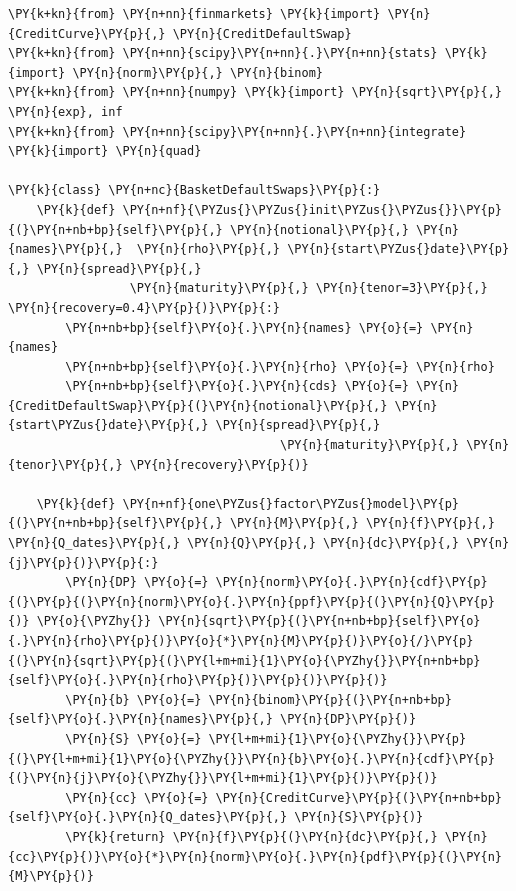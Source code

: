 \begin{tcolorbox}[breakable, size=fbox, boxrule=1pt, pad at break*=1mm,colback=cellbackground, colframe=cellborder]
\begin{Verbatim}[commandchars=\\\{\}]
\PY{k+kn}{from} \PY{n+nn}{finmarkets} \PY{k}{import} \PY{n}{CreditCurve}\PY{p}{,} \PY{n}{CreditDefaultSwap}
\PY{k+kn}{from} \PY{n+nn}{scipy}\PY{n+nn}{.}\PY{n+nn}{stats} \PY{k}{import} \PY{n}{norm}\PY{p}{,} \PY{n}{binom}
\PY{k+kn}{from} \PY{n+nn}{numpy} \PY{k}{import} \PY{n}{sqrt}\PY{p}{,} \PY{n}{exp}, inf
\PY{k+kn}{from} \PY{n+nn}{scipy}\PY{n+nn}{.}\PY{n+nn}{integrate} \PY{k}{import} \PY{n}{quad}
		
\PY{k}{class} \PY{n+nc}{BasketDefaultSwaps}\PY{p}{:}
    \PY{k}{def} \PY{n+nf}{\PYZus{}\PYZus{}init\PYZus{}\PYZus{}}\PY{p}{(}\PY{n+nb+bp}{self}\PY{p}{,} \PY{n}{notional}\PY{p}{,} \PY{n}{names}\PY{p}{,}  \PY{n}{rho}\PY{p}{,} \PY{n}{start\PYZus{}date}\PY{p}{,} \PY{n}{spread}\PY{p}{,} 
                 \PY{n}{maturity}\PY{p}{,} \PY{n}{tenor=3}\PY{p}{,} \PY{n}{recovery=0.4}\PY{p}{)}\PY{p}{:}
        \PY{n+nb+bp}{self}\PY{o}{.}\PY{n}{names} \PY{o}{=} \PY{n}{names}
        \PY{n+nb+bp}{self}\PY{o}{.}\PY{n}{rho} \PY{o}{=} \PY{n}{rho}
        \PY{n+nb+bp}{self}\PY{o}{.}\PY{n}{cds} \PY{o}{=} \PY{n}{CreditDefaultSwap}\PY{p}{(}\PY{n}{notional}\PY{p}{,} \PY{n}{start\PYZus{}date}\PY{p}{,} \PY{n}{spread}\PY{p}{,} 
                                      \PY{n}{maturity}\PY{p}{,} \PY{n}{tenor}\PY{p}{,} \PY{n}{recovery}\PY{p}{)} 
		
    \PY{k}{def} \PY{n+nf}{one\PYZus{}factor\PYZus{}model}\PY{p}{(}\PY{n+nb+bp}{self}\PY{p}{,} \PY{n}{M}\PY{p}{,} \PY{n}{f}\PY{p}{,} \PY{n}{Q_dates}\PY{p}{,} \PY{n}{Q}\PY{p}{,} \PY{n}{dc}\PY{p}{,} \PY{n}{j}\PY{p}{)}\PY{p}{:}
        \PY{n}{DP} \PY{o}{=} \PY{n}{norm}\PY{o}{.}\PY{n}{cdf}\PY{p}{(}\PY{p}{(}\PY{n}{norm}\PY{o}{.}\PY{n}{ppf}\PY{p}{(}\PY{n}{Q}\PY{p}{)} \PY{o}{\PYZhy{}} \PY{n}{sqrt}\PY{p}{(}\PY{n+nb+bp}{self}\PY{o}{.}\PY{n}{rho}\PY{p}{)}\PY{o}{*}\PY{n}{M}\PY{p}{)}\PY{o}{/}\PY{p}{(}\PY{n}{sqrt}\PY{p}{(}\PY{l+m+mi}{1}\PY{o}{\PYZhy{}}\PY{n+nb+bp}{self}\PY{o}{.}\PY{n}{rho}\PY{p}{)}\PY{p}{)}\PY{p}{)}
        \PY{n}{b} \PY{o}{=} \PY{n}{binom}\PY{p}{(}\PY{n+nb+bp}{self}\PY{o}{.}\PY{n}{names}\PY{p}{,} \PY{n}{DP}\PY{p}{)}
        \PY{n}{S} \PY{o}{=} \PY{l+m+mi}{1}\PY{o}{\PYZhy{}}\PY{p}{(}\PY{l+m+mi}{1}\PY{o}{\PYZhy{}}\PY{n}{b}\PY{o}{.}\PY{n}{cdf}\PY{p}{(}\PY{n}{j}\PY{o}{\PYZhy{}}\PY{l+m+mi}{1}\PY{p}{)}\PY{p}{)}
        \PY{n}{cc} \PY{o}{=} \PY{n}{CreditCurve}\PY{p}{(}\PY{n+nb+bp}{self}\PY{o}{.}\PY{n}{Q_dates}\PY{p}{,} \PY{n}{S}\PY{p}{)}
        \PY{k}{return} \PY{n}{f}\PY{p}{(}\PY{n}{dc}\PY{p}{,} \PY{n}{cc}\PY{p}{)}\PY{o}{*}\PY{n}{norm}\PY{o}{.}\PY{n}{pdf}\PY{p}{(}\PY{n}{M}\PY{p}{)}
		

\end{Verbatim}
\end{tcolorbox}
